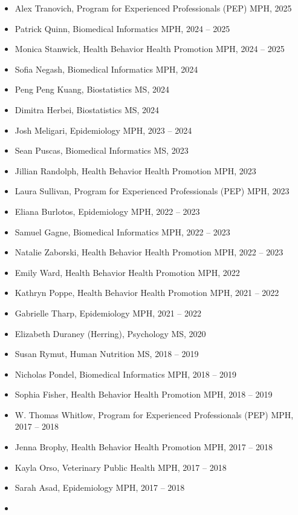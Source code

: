 \documentclass[
  english,
  letterpaper,
  DIV=11,
  numbers=noendperiod]{scrartcl}
\providecommand{\tightlist}{%
  \setlength{\itemsep}{0pt}\setlength{\parskip}{0pt}}
\begin{document}
\begin{itemize}
\tightlist
\item
  Alex Tranovich, Program for Experienced Professionals (PEP) MPH, 2025
\item
  Patrick Quinn, Biomedical Informatics MPH, 2024 -- 2025
\item
  Monica Stanwick, Health Behavior Health Promotion MPH, 2024 -- 2025
\item
  Sofia Negash, Biomedical Informatics MPH, 2024
\item
  Peng Peng Kuang, Biostatistics MS, 2024
\item
  Dimitra Herbei, Biostatistics MS, 2024
\item
  Josh Meligari, Epidemiology MPH, 2023 -- 2024
\item
  Sean Puscas, Biomedical Informatics MS, 2023
\item
  Jillian Randolph, Health Behavior Health Promotion MPH, 2023
\item
  Laura Sullivan, Program for Experienced Professionals (PEP) MPH, 2023
\item
  Eliana Burlotos, Epidemiology MPH, 2022 -- 2023
\item
  Samuel Gagne, Biomedical Informatics MPH, 2022 -- 2023
\item
  Natalie Zaborski, Health Behavior Health Promotion MPH, 2022 -- 2023
\item
  Emily Ward, Health Behavior Health Promotion MPH, 2022
\item
  Kathryn Poppe, Health Behavior Health Promotion MPH, 2021 -- 2022
\item
  Gabrielle Tharp, Epidemiology MPH, 2021 -- 2022
\item
  Elizabeth Duraney (Herring), Psychology MS, 2020
\item
  Susan Rymut, Human Nutrition MS, 2018 -- 2019
\item
  Nicholas Pondel, Biomedical Informatics MPH, 2018 -- 2019
\item
  Sophia Fisher, Health Behavior Health Promotion MPH, 2018 -- 2019
\item
  W. Thomas Whitlow, Program for Experienced Professionals (PEP) MPH,
  2017 -- 2018
\item
  Jenna Brophy, Health Behavior Health Promotion MPH, 2017 -- 2018
\item
  Kayla Orso, Veterinary Public Health MPH, 2017 -- 2018
\item
  Sarah Asad, Epidemiology MPH, 2017 -- 2018
\item

\end{itemize}
\end{document}
